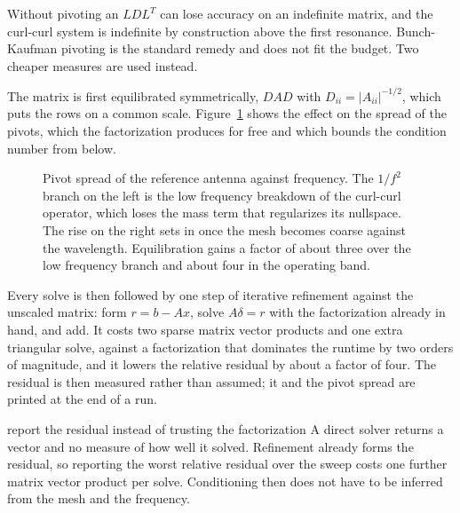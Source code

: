 \documentclass[11pt]{article}
\begin{document}
Without pivoting an \(LDL^T\) can lose accuracy on an indefinite matrix, and
the curl-curl system is indefinite by construction above the first
resonance. Bunch-Kaufman pivoting is the standard remedy and does not
fit the budget. Two cheaper measures are used instead.

The matrix is first equilibrated symmetrically, \(D A D\) with \(D_{ii} =
|A_{ii}|^{-1/2}\), which puts the rows on a common scale. Figure~\ref{fig:cond}
shows the effect on the spread of the pivots, which the factorization
produces for free and which bounds the condition number from below.

\begin{figure}[H]
\centering
{}
\caption{Pivot spread of the reference antenna against frequency. The
\(1/f^2\) branch on the left is the low frequency breakdown of the
curl-curl operator, which loses the mass term that regularizes its
nullspace. The rise on the right sets in once the mesh becomes coarse
against the wavelength. Equilibration gains a factor of about three over the
low frequency branch and about four in the operating band.}
\label{fig:cond}
\end{figure}

Every solve is then followed by one step of iterative refinement against the
unscaled matrix: form \(r = b - Ax\), solve \(A \delta = r\) with the
factorization already in hand, and add. It costs two sparse matrix vector
products and one extra triangular solve, against a factorization that
dominates the runtime by two orders of magnitude, and it lowers the relative
residual by about a factor of four. The residual is then measured rather
than assumed; it and the pivot spread are printed at the end of a run.

\begin{decision}{report the residual instead of trusting the factorization}
A direct solver returns a vector and no measure of how well it solved.
Refinement already forms the residual, so reporting the worst relative
residual over the sweep costs one further matrix vector product per solve.
Conditioning then does not have to be inferred from the mesh and the
frequency.
\end{decision}
\end{document}
